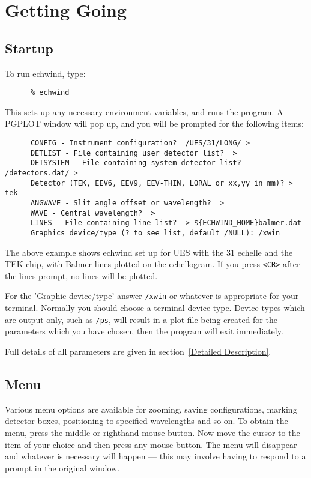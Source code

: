 \documentclass[11pt]{article}
\begin{document}
\section{Getting Going}
\subsection{Startup}

To run echwind, type:

\begin{verbatim}
      % echwind
\end{verbatim}

This sets up any necessary environment variables, and runs the program. A
PGPLOT window will pop up, and you will be prompted for the following
items:

\begin{verbatim}
      CONFIG - Instrument configuration?  /UES/31/LONG/ >
      DETLIST - File containing user detector list?  >
      DETSYSTEM - File containing system detector list?  /detectors.dat/ >
      Detector (TEK, EEV6, EEV9, EEV-THIN, LORAL or xx,yy in mm)? > tek
      ANGWAVE - Slit angle offset or wavelength?  >
      WAVE - Central wavelength?  >
      LINES - File containing line list?  > ${ECHWIND_HOME}balmer.dat
      Graphics device/type (? to see list, default /NULL): /xwin
\end{verbatim}

The above example shows echwind set up for UES with the 31 echelle and the
TEK chip, with Balmer lines plotted on the echellogram. If you press
\verb+<CR>+ after the lines prompt, no lines will be plotted.

For the 'Graphic device/type' answer {\tt /xwin} or whatever is appropriate
for your terminal. Normally you should choose a terminal device type. Device
types which are output only, such as {\tt /ps}, will result in a plot file being
created for the parameters which you have chosen,
then the program will exit immediately.

Full details of all parameters are given in section~\ref{Detailed Description}.

\subsection{Menu}

Various menu options are available for zooming, saving configurations,
marking detector boxes, positioning to specified wavelengths and so on. To
obtain the menu, press the middle or righthand mouse button.
Now move the cursor to the item of your choice and then press
any mouse button. The menu will disappear and whatever is necessary will
happen --- this may involve having to respond to a prompt in the original
window.
\end{document}

